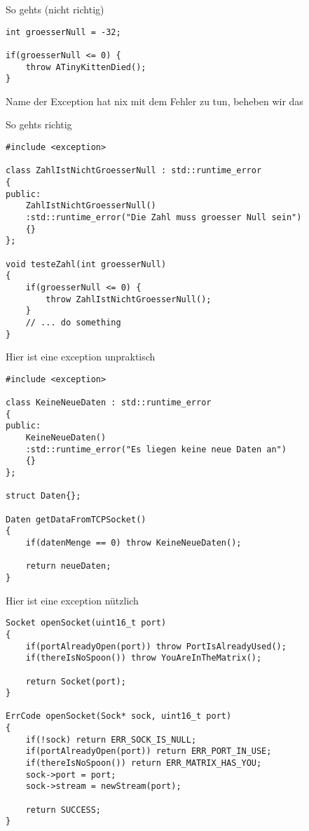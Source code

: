 \begin{frame}[fragile]{So gehts (nicht richtig)}
	\begin{lstlisting}[]
int groesserNull = -32;

if(groesserNull <= 0) {
    throw ATinyKittenDied();
}
	\end{lstlisting}

Name der Exception hat nix mit dem Fehler zu tun, beheben wir das

\end{frame}
\begin{frame}[fragile]{So gehts richtig}
	\begin{lstlisting}[]
#include <exception>

class ZahlIstNichtGroesserNull : std::runtime_error
{
public:
    ZahlIstNichtGroesserNull()
    :std::runtime_error("Die Zahl muss groesser Null sein")
    {}
};

void testeZahl(int groesserNull)
{
    if(groesserNull <= 0) {
        throw ZahlIstNichtGroesserNull();
    }
    // ... do something
}
	\end{lstlisting}

\end{frame}

\begin{frame}[fragile]{Hier ist eine exception unpraktisch}
	\begin{lstlisting}[]
#include <exception>

class KeineNeueDaten : std::runtime_error
{
public:
    KeineNeueDaten()
    :std::runtime_error("Es liegen keine neue Daten an")
    {}
};

struct Daten{};

Daten getDataFromTCPSocket()
{
    if(datenMenge == 0) throw KeineNeueDaten();
    
    return neueDaten;
}
	\end{lstlisting}

\end{frame}

\begin{frame}[fragile]{Hier ist eine exception nützlich}
	\begin{lstlisting}[]
Socket openSocket(uint16_t port)
{
    if(portAlreadyOpen(port)) throw PortIsAlreadyUsed();
    if(thereIsNoSpoon()) throw YouAreInTheMatrix();
    
    return Socket(port);
}

ErrCode openSocket(Sock* sock, uint16_t port)
{
    if(!sock) return ERR_SOCK_IS_NULL;
    if(portAlreadyOpen(port)) return ERR_PORT_IN_USE;
    if(thereIsNoSpoon()) return ERR_MATRIX_HAS_YOU;
    sock->port = port;
    sock->stream = newStream(port);

    return SUCCESS;
}
	\end{lstlisting}

\end{frame}

